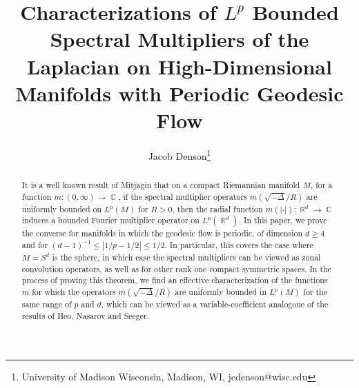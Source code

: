 \documentclass[dvipsnames,letterpaper,12pt]{article}
\title{Characterizations of $L^p$ Bounded Spectral Multipliers of the Laplacian on High-Dimensional Manifolds with Periodic Geodesic Flow}
\author{Jacob Denson\footnote{University of Madison Wisconsin, Madison, WI, jcdenson@wisc.edu}}
\DeclareMathOperator{\RR}{\mathbb{R}}
\DeclareMathOperator{\CC}{\mathbb{C}}
\begin{document}
\maketitle

\begin{abstract}
    It is a well known result of Mitjagin that on a compact Riemannian manifold $M$, for a function $m: (0,\infty) \to \CC$, if the spectral multiplier operators $m(\sqrt{-\Delta}/R)$ are uniformly bounded on $L^p(M)$ for $R > 0$, then the radial function $m(|\cdot|): \RR^d \to \CC$ induces a bounded Fourier multiplier operator on $L^p(\RR^d)$. In this paper, we prove the converse for manifolds in which the geodesic flow is periodic, of dimension $d \geq 4$ and for $(d-1)^{-1} \leq |1/p - 1/2| \leq 1/2$. In particular, this covers the case where $M = S^d$ is the sphere, in which case the spectral multipliers can be viewed as zonal convolution operators, as well as for other rank one compact symmetric spaces. In the process of proving this theorem, we find an effective characterization of the functions $m$ for which the operators $m(\sqrt{-\Delta}/R)$ are uniformly bounded in $L^p(M)$ for the same range of $p$ and $d$, which can be viewed as a variable-coefficient analogoue of the results of Heo, Nasarov and Seeger.


\end{abstract}
\end{document}
